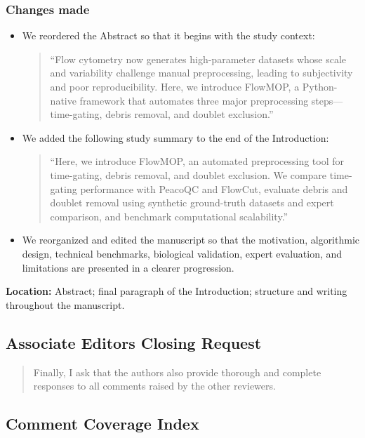 \documentclass[
  11pt,
  a4paper,
]{article}
\begin{document}
\subsubsection{Changes made}\label{changes-made-15}

\begin{itemize}
\item
  We reordered the Abstract so that it begins with the study context:

  \begin{quote}
  ``Flow cytometry now generates high-parameter datasets whose scale and
  variability challenge manual preprocessing, leading to subjectivity
  and poor reproducibility. Here, we introduce FlowMOP, a Python-native
  framework that automates three major preprocessing
  steps---time-gating, debris removal, and doublet exclusion.''
  \end{quote}
\item
  We added the following study summary to the end of the Introduction:

  \begin{quote}
  ``Here, we introduce FlowMOP, an automated preprocessing tool for
  time-gating, debris removal, and doublet exclusion. We compare
  time-gating performance with PeacoQC and FlowCut, evaluate debris and
  doublet removal using synthetic ground-truth datasets and expert
  comparison, and benchmark computational scalability.''
  \end{quote}
\item
  We reorganized and edited the manuscript so that the motivation,
  algorithmic design, technical benchmarks, biological validation,
  expert evaluation, and limitations are presented in a clearer
  progression.
\end{itemize}

\textbf{Location:} Abstract; final paragraph of the Introduction;
structure and writing throughout the manuscript.

\subsection{Associate Editor\textquotesingle s Closing
Request}\label{associate-editors-closing-request}

\begin{quote}
Finally, I ask that the authors also provide thorough and complete
responses to all comments raised by the other reviewers.
\end{quote}

\subsection{Comment Coverage Index}\label{comment-coverage-index}
\end{document}
